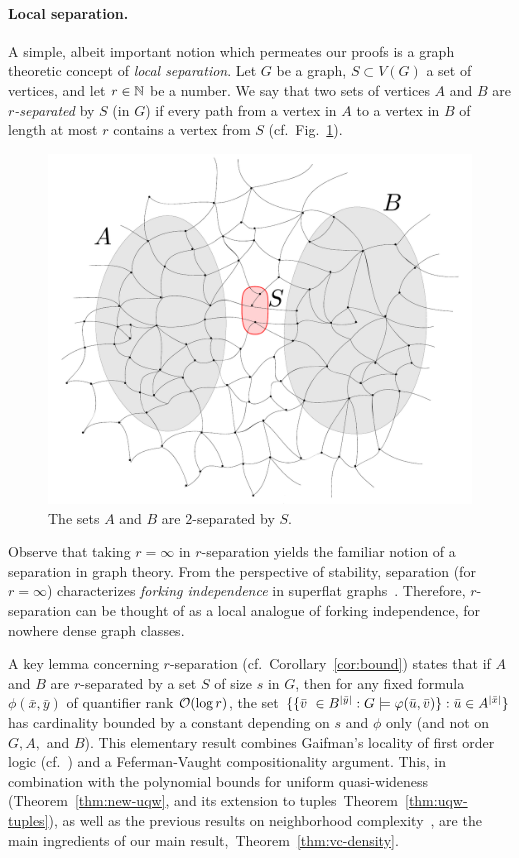 \paragraph{Local separation.}
A simple, albeit important notion which permeates our proofs
is a graph theoretic concept of \emph{local separation}.
Let $G$ be a graph, $S\subset V(G)$ a set of vertices,
and let $r\in \mathbb{N}$ be a number. We say that two  sets of vertices $A$ and $B$  are \emph{$r$-separated} by $S$ (in $G$) if every path from a vertex in $A$ to a vertex in $B$
of length at most $r$ contains a vertex from $S$ (cf.~Fig.~\ref{fig:sep}).
 \begin{figure}[h!]
 	\centering
 		\includegraphics[scale=0.3,page=1]{pics}
 	\caption{The sets $A$ and $B$ are $2$-separated by $S$.
 	}
 	\label{fig:sep}
 \end{figure}
Observe that taking $r=\infty$ in $r$-separation yields the familiar notion of a separation in graph theory.
From the perspective of stability, separation (for $r=\infty$) characterizes \emph{forking independence} in superflat graphs~\cite{ivanov}. Therefore,
$r$-separation can be thought of as a local analogue of forking independence, for nowhere dense graph classes.

A key lemma concerning $r$-separation (cf.~Corollary~\ref{cor:bound}) states that if $A$
and $B$ are $r$-separated by a set $S$ of size $s$ in $G$,
then for any fixed formula $\phi(\bar x,\bar y)$
of quantifier rank $\mathcal{O}(\log r)$,
the set  $\{\{\bar{v}\ \in B^{|\bar y|} : G\models\varphi(\bar{u},\bar{v})\} : \bar{u}\in A^{|\bar x|}\}$ has cardinality bounded by a constant depending on $s$ and $\phi$ only (and not on $G,A,$ and $B$). 
This elementary result combines Gaifman's locality of first order logic (cf.~\cite{gaifman1982local}) and a Feferman-Vaught compositionality argument. This, in combination with the polynomial bounds 
for uniform quasi-wideness (Theorem~\ref{thm:new-uqw}, and its extension to tuples~Theorem~\ref{thm:uqw-tuples}), 
as well as the previous results on neighborhood complexity~\cite{drange2016kernelization,eickmeyer2016neighborhood}, are the main ingredients of our main result,~Theorem~\ref{thm:vc-density}.

